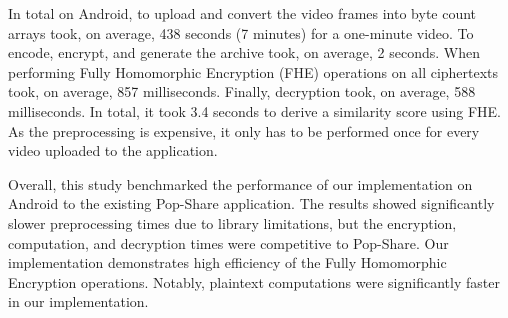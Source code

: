 In total on Android, to upload and convert the video frames into byte count arrays took, on average, 438 seconds (7 minutes) for a one-minute video. To encode, encrypt, and generate the archive took, on average, 2 seconds. When performing Fully Homomorphic Encryption (FHE) operations on all ciphertexts took, on average, 857 milliseconds. Finally, decryption took, on average, 588 milliseconds. In total, it took 3.4 seconds to derive a similarity score using FHE. As the preprocessing is expensive, it only has to be performed once for every video uploaded to the application.

Overall, this study benchmarked the performance of our implementation on Android to the existing Pop-Share application. The results showed significantly slower preprocessing times due to library limitations, but the encryption, computation, and decryption times were competitive to Pop-Share. Our implementation demonstrates high efficiency of the Fully Homomorphic Encryption operations. Notably, plaintext computations were significantly faster in our implementation.
